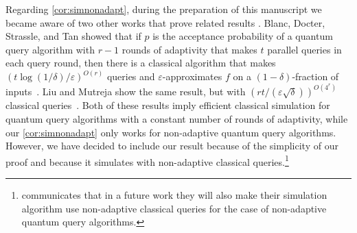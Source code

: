 \documentclass[11pt]{article}
\newcommand{\1}{\mathbf{1}}
\newcommand{\eps}{\varepsilon}
\theoremstyle{plain}
\theoremstyle{definition}
\theoremstyle{remark}
\begin{document}
Regarding \cref{cor:simnonadapt}, during the preparation of this manuscript we became aware of two other works that prove related results \cite{AA2026boundedadaptivity,liu2026parallel}.
Blanc, Docter, Strassle, and Tan showed that if $p$ is the acceptance probability of a quantum query algorithm with $r-1$ rounds of adaptivity that makes $t$ parallel queries in each query round, then there is a classical algorithm that makes $(t \log(1/\delta)/\eps)^{O(r)}$ queries and $\eps$-approximates $f$ on a $(1-\delta)$-fraction of inputs~\cite{AA2026boundedadaptivity}. Liu and Mutreja show the same result, but with $(rt/(\eps\sqrt{\delta}))^{O(4^r)}$ classical queries~\cite{liu2026parallel}. Both of these results imply efficient classical simulation for quantum query algorithms with a constant number of rounds of adaptivity, while our \cref{cor:simnonadapt} only works for non-adaptive quantum query algorithms. However, we have decided to include our result because of the simplicity of our proof and because it simulates with non-adaptive classical queries.\footnote{\cite{AA2026boundedadaptivity} communicates that in a future work they will also make their simulation algorithm use non-adaptive classical queries for the case of non-adaptive quantum query algorithms.} 
\end{document}
